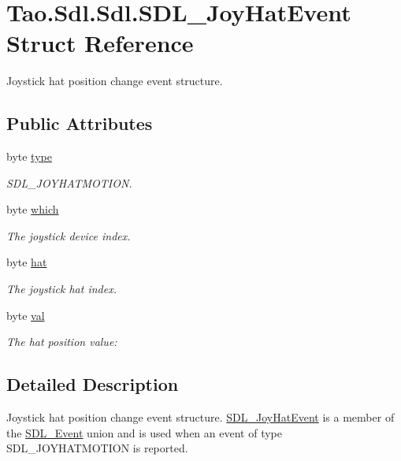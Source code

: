 \hypertarget{struct_tao_1_1_sdl_1_1_sdl_1_1_s_d_l___joy_hat_event}{
\section{Tao.Sdl.Sdl.SDL\_\-JoyHatEvent Struct Reference}
\label{struct_tao_1_1_sdl_1_1_sdl_1_1_s_d_l___joy_hat_event}
}


Joystick hat position change event structure.  


\subsection*{Public Attributes}
\begin{DoxyCompactItemize}
\item 
byte \hyperlink{struct_tao_1_1_sdl_1_1_sdl_1_1_s_d_l___joy_hat_event_a504a458cdb6163c0fd06bdf0f5adc330}{type}
\begin{DoxyCompactList}\small\item\em SDL\_\-JOYHATMOTION. \item\end{DoxyCompactList}\item 
byte \hyperlink{struct_tao_1_1_sdl_1_1_sdl_1_1_s_d_l___joy_hat_event_a432ddbd1d5b39e4ab65e90414fb04aca}{which}
\begin{DoxyCompactList}\small\item\em The joystick device index. \item\end{DoxyCompactList}\item 
byte \hyperlink{struct_tao_1_1_sdl_1_1_sdl_1_1_s_d_l___joy_hat_event_af4a1d5fb1c29cb4359322b7341d4db42}{hat}
\begin{DoxyCompactList}\small\item\em The joystick hat index. \item\end{DoxyCompactList}\item 
byte \hyperlink{struct_tao_1_1_sdl_1_1_sdl_1_1_s_d_l___joy_hat_event_a0a000070dcc327197403faeaf76bbe87}{val}
\begin{DoxyCompactList}\small\item\em The hat position value: \item\end{DoxyCompactList}\end{DoxyCompactItemize}


\subsection{Detailed Description}
Joystick hat position change event structure. \hyperlink{struct_tao_1_1_sdl_1_1_sdl_1_1_s_d_l___joy_hat_event}{SDL\_\-JoyHatEvent} is a member of the \hyperlink{struct_tao_1_1_sdl_1_1_s_d_l___event}{SDL\_\-Event} union and is used when an event of type SDL\_\-JOYHATMOTION is reported. 

